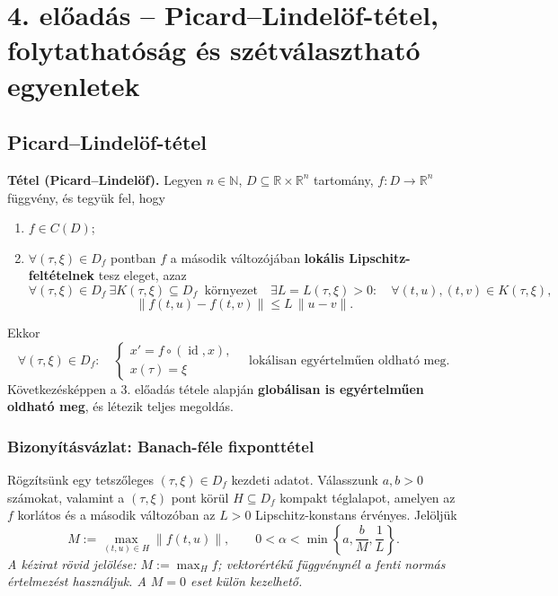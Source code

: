 \graphicspath{{lectures/04_eloadas_abrak/}}

\section{4. előadás -- Picard--Lindelöf-tétel, folytathatóság és szétválasztható egyenletek}

\subsection{Picard--Lindelöf-tétel}

\noindent\textbf{Tétel (Picard--Lindelöf).}
Legyen $n\in\mathbb N$, $D\subseteq\mathbb R\times\mathbb R^n$ tartomány,
$f:D\to\mathbb R^n$ függvény, és tegyük fel, hogy
\begin{enumerate}[label=\arabic*)]
\item $f\in C(D)$;
\item $\forall(\tau,\xi)\in D_f$ pontban $f$ a második változójában
      \textbf{lokális Lipschitz-feltételnek} tesz eleget, azaz
      \[
      \forall(\tau,\xi)\in D_f\ \exists K(\tau,\xi)\subseteq D_f\ \text{ környezet}\quad
      \exists L=L(\tau,\xi)>0:\quad
      \forall (t,u),(t,v)\in K(\tau,\xi),
      \]
      \[
      \|f(t,u)-f(t,v)\|\le L\,\|u-v\|.
      \]
\end{enumerate}
Ekkor
\[
\boxed{\forall(\tau,\xi)\in D_f:\quad
\begin{cases}
 x'=f\circ(\operatorname{id},x),\\
 x(\tau)=\xi
\end{cases}
\quad\text{lokálisan egyértelműen oldható meg.}}
\]
Következésképpen a 3. előadás tétele alapján
\textbf{globálisan is egyértelműen oldható meg}, és létezik teljes megoldás.

\subsubsection*{Bizonyításvázlat: Banach-féle fixponttétel}
Rögzítsünk egy tetszőleges $(\tau,\xi)\in D_f$ kezdeti adatot.
Válasszunk $a,b>0$ számokat, valamint a $(\tau,\xi)$ pont körül
$H\subseteq D_f$ kompakt téglalapot, amelyen az $f$ korlátos és a
második változóban az $L>0$ Lipschitz-konstans érvényes.
Jelöljük
\[
 M:=\max_{(t,u)\in H}\|f(t,u)\|,
 \qquad 0<\alpha<\min\!\left\{a,\frac{b}{M},\frac1L\right\}.
\]
\noindent\textit{A kézirat rövid jelölése: $M:=\max_H f$; vektorértékű függvénynél a fenti normás értelmezést használjuk. A $M=0$ eset külön kezelhető.}

